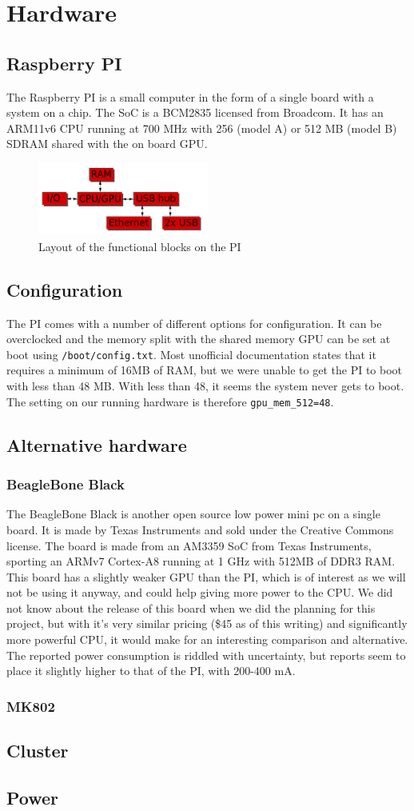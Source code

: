 \section{Hardware}
\subsection{Raspberry PI}
The Raspberry PI is a small computer in the form of a single board with a system on a chip. The SoC is a BCM2835 licensed from Broadcom. It has an ARM11v6 CPU running at 700 MHz with 256 (model A) or 512 MB (model B) SDRAM shared with the on board GPU.
\begin{figure}
    \includegraphics[width=0.5\textwidth]{hardware/raspberrypi_block_function}
    \caption{Layout of the functional blocks on the PI}
    \label{fig:pi_blockdiagram}
\end{figure}
\subsection{Configuration}
The PI comes with a number of different options for configuration. It can be overclocked and the memory split with the shared memory GPU can be set at boot using {\tt /boot/config.txt}.
Most unofficial documentation states that it requires a minimum of 16MB of RAM, but we were unable to get the PI to boot with less than 48 MB. With less than 48, it seems the system never gets to boot.
The setting on our running hardware is therefore {\tt gpu\_mem\_512=48}.
\subsection{Alternative hardware}
\subsubsection{BeagleBone Black}
The BeagleBone Black is another open source low power mini pc on a single board. It is made by Texas Instruments and sold under the Creative Commons license.
The board is made from an AM3359 SoC from Texas Instruments, sporting an ARMv7 Cortex-A8 running at 1 GHz with 512MB of DDR3 RAM. This board has a slightly weaker GPU than the PI, which is of interest as we will not be using it anyway, and could help giving more power to the CPU.
We did not know about the release of this board when we did the planning for this project, but with it's very similar pricing (\$45 as of this writing) and significantly more powerful CPU, it would make for an interesting comparison and alternative. The reported power consumption is riddled with uncertainty, but reports seem to place it slightly higher to that of the PI, with 200-400 mA.
\subsubsection{MK802}

\subsection{Cluster}
\subsection{Power}
